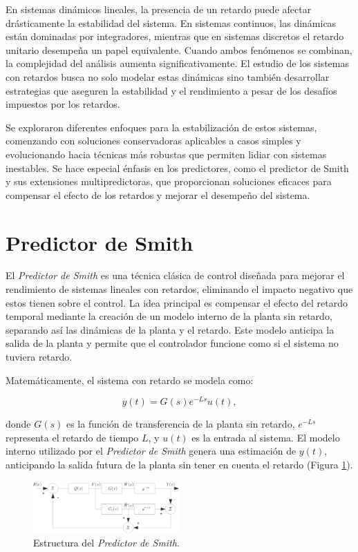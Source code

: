 \documentclass[conference]{IEEEtran}
\begin{document}
En sistemas dinámicos lineales, la presencia de un retardo puede afectar drásticamente la estabilidad del sistema. En sistemas continuos, las dinámicas están dominadas por integradores, mientras que en sistemas discretos el retardo unitario desempeña un papel equivalente. Cuando ambos fenómenos se combinan, la complejidad del análisis aumenta significativamente. El estudio de los sistemas con retardos busca no solo modelar estas dinámicas sino también desarrollar estrategias que aseguren la estabilidad y el rendimiento a pesar de los desafíos impuestos por los retardos.

Se exploraron diferentes enfoques para la estabilización de estos sistemas, comenzando con soluciones conservadoras aplicables a casos simples y evolucionando hacia técnicas más robustas que permiten lidiar con sistemas inestables. Se hace especial énfasis en los predictores, como el predictor de Smith y sus extensiones multipredictoras, que proporcionan soluciones eficaces para compensar el efecto de los retardos y mejorar el desempeño del sistema.


\section{Predictor de Smith}

El \textit{Predictor de Smith} es una técnica clásica de control diseñada para mejorar el rendimiento de sistemas lineales con retardos, eliminando el impacto negativo que estos tienen sobre el control. La idea principal es compensar el efecto del retardo temporal mediante la creación de un modelo interno de la planta sin retardo, separando así las dinámicas de la planta y el retardo. Este modelo anticipa la salida de la planta y permite que el controlador funcione como si el sistema no tuviera retardo.

Matemáticamente, el sistema con retardo se modela como:

\[
	y(t) = G(s) e^{-Ls} u(t),
\]

donde \( G(s) \) es la función de transferencia de la planta sin retardo, \( e^{-Ls} \) representa el retardo de tiempo \( L \), y \( u(t) \) es la entrada al sistema. El modelo interno utilizado por el \textit{Predictor de Smith} genera una estimación de \( y(t) \), anticipando la salida futura de la planta sin tener en cuenta el retardo (Figura \ref{fig:smith_predictor}).

\begin{figure}[htbp]
	\centerline{\includegraphics[width=0.5\textwidth]{smith_predictor.png}}
	\caption{Estructura del \textit{Predictor de Smith}.}
	\label{fig:smith_predictor}
\end{figure}
\end{document}
